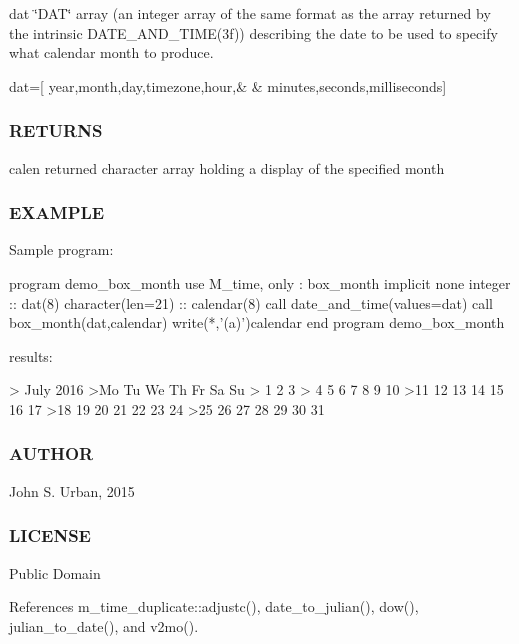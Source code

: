 dat \char`\"{}\+D\+A\+T\char`\"{} array (an integer array of the same format as the array returned by the intrinsic D\+A\+T\+E\+\_\+\+A\+N\+D\+\_\+\+T\+I\+M\+E(3f)) describing the date to be used to specify what calendar month to produce. \begin{DoxyVerb}   dat=[ year,month,day,timezone,hour,&
    & minutes,seconds,milliseconds]
\end{DoxyVerb}
 \subsubsection*{R\+E\+T\+U\+R\+NS}

calen returned character array holding a display of the specified month

\subsubsection*{E\+X\+A\+M\+P\+LE}

\begin{DoxyVerb}Sample program:

 program demo_box_month
 use M_time, only : box_month
 implicit none
 integer           :: dat(8)
 character(len=21) :: calendar(8)
    call date_and_time(values=dat)
    call box_month(dat,calendar)
    write(*,'(a)')calendar
 end program demo_box_month

results:

  >     July 2016
  >Mo Tu We Th Fr Sa Su
  >             1  2  3
  > 4  5  6  7  8  9 10
  >11 12 13 14 15 16 17
  >18 19 20 21 22 23 24
  >25 26 27 28 29 30 31
\end{DoxyVerb}


\subsubsection*{A\+U\+T\+H\+OR}

John S. Urban, 2015 \subsubsection*{L\+I\+C\+E\+N\+SE}

Public Domain 

References m\+\_\+time\+\_\+duplicate\+::adjustc(), date\+\_\+to\+\_\+julian(), dow(), julian\+\_\+to\+\_\+date(), and v2mo().

